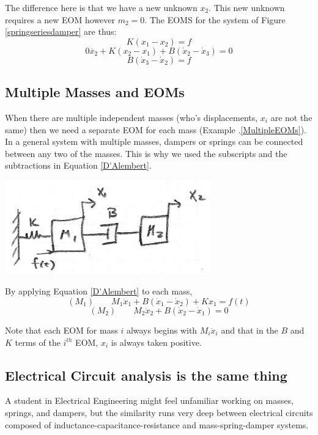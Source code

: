 The difference here is that we have a new unknown $x_2$.    This new unknown requires a new EOM however $m_2 =0$.   The EOMS for the system of Figure \ref{springseriesdamper} are thus:
\[
K(x_1-x_2) = f
\]
\[
0\ddot{x_2} + K(x_2-x_1) + B(\dot{x}_2-\dot{x}_3) = 0
\]
\[
B(\dot{x}_3-\dot{x}_2) = f
\]






\subsection{Multiple Masses and EOMs}
When there are multiple independent masses (who's displacements, $x_i$ are not the same) then we need a separate EOM for each mass (Example \thechapter.\ref{MultipleEOMs}).
In a general system with multiple masses, dampers or springs can be connected between any two of the masses.  This is why we used the subscripts and the subtractions in Equation \ref{D'Alembert}.



\begin{ExampleSmall}\label{MultipleEOMs}


\includegraphics[width=3.5in]{figs02/00726a.png}



By applying Equation \ref{D'Alembert} to each mass,
\[
(M_1) \qquad M_1\ddot{x}_1 + B(\dot{x}_1 - \dot{x}_2) + Kx_1 = f(t)
\]
\[
(M_2) \qquad M_2\ddot{x}_2 + B(\dot{x}_2-\dot{x}_1)  = 0
\]

Note that each EOM for mass $i$ always begins with $M_i\ddot{x}_i$ and that in the $B$ and
$K$ terms of the  $i^{th}$ EOM, $x_i$ is always taken positive.
\end{ExampleSmall}




\subsection{Electrical Circuit analysis is the same thing}
A student in Electrical Engineering might feel unfamiliar working
on masses, springs, and dampers, but the similarity runs very deep
between electrical circuits composed of inductance-capacitance-resistance and mass-spring-damper systems.

